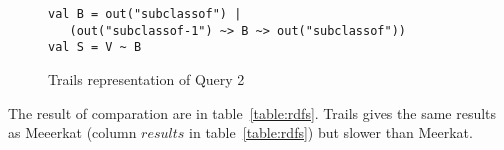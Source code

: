 \begin{figure}[h]
\begin{lstlisting}
val B = out("subclassof") |
   (out("subclassof-1") ~> B ~> out("subclassof"))
val S = V ~ B
\end{lstlisting}
\caption{Trails representation of Query 2}
\label{fig:query2Trails}
\end{figure}

The result of comparation are in table~\ref{table:rdfs}.
Trails gives the same results as Meeerkat (column $results$ in table~\ref{table:rdfs}) but slower than Meerkat.

